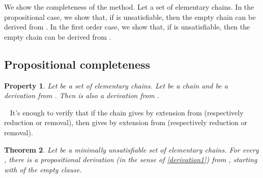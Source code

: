\documentclass{article}
\newtheorem{theoreme}{Theorem}\newtheorem{lemme}[theoreme]{Lemma}
\newtheorem{propriete}[theoreme]{Property}
\newenvironment{preuve}{\noindent {\em Proof :}\ }{{\hfill
    }\vspace{.5pc}} \newcommand{\sg}{\!\!<\!\!}
\begin{document}
We show the completeness of the method. Let  a set of elementary chains. In the propositional case, we show
that, if  is unsatisfiable, then the empty chain can be derived from . In the first order case,
we show that, if  is unsatisfiable, then the empty chain can be derived from .

\subsection{Propositional completeness}

\begin{propriete}\label{concatenate-property}
Let  be a set of elementary chains. Let  be a chain and  be a derivation from .
Then  is also a derivation from .

\end{propriete}

\begin{preuve}
It's enough to verify that if the chain  gives  by extension from  (respectively reduction or removal), 
then  gives  by extension from  (respectively reduction or removal).
\end{preuve}

\begin{theoreme}\label{completeness-minimal-propositional}
Let  be a minimally unsatisfiable set of elementary chains. For every , there is a propositional derivation
(in the sense of \ref{derivation1}) from , starting with  of the empty clause.
\end{theoreme}
\end{document}
